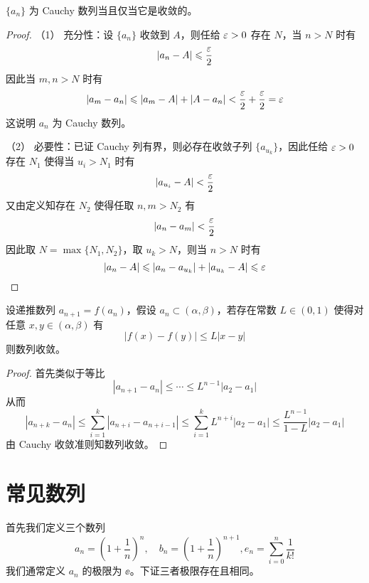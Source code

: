 \begin{theorem}
	$\{a_n\}$ 为 Cauchy 数列当且仅当它是收敛的。
\end{theorem}
\begin{proof}
	（1） 充分性：设 $\{a_n\}$ 收敛到 $A$，则任给 $\varepsilon >0$ 存在 $N$，当 $n>N$ 时有
	\[|a_n-A|\leqslant \frac{\varepsilon}{2}\]
	因此当 $m,n>N$ 时有
	\[|a_m-a_n| \leqslant |a_m-A| + |A-a_n| < \frac{\varepsilon}{2}+\frac{\varepsilon}{2}=\varepsilon\]
	这说明 $a_n$ 为 Cauchy 数列。

	（2） 必要性：已证 Cauchy 列有界，则必存在收敛子列 $\{a_{u_k}\}$，因此任给 $\varepsilon > 0$ 存在 $N_1$ 使得当 $u_i > N_1$ 时有
	\[ | a_{u_i} - A| < \frac{\varepsilon}{2} \]
	又由定义知存在 $N_2$ 使得任取 $n, m > N_2$ 有
	\[ |a_n - a_m| < \frac{\varepsilon}{2} \]
	因此取 $N = \max\{N_1, N_2\}$，取 $u_k > N$，则当 $n > N$ 时有
	\[ |a_n - A| \leqslant |a_n - a_{u_k}| + | a_{u_k} - A| \leqslant \varepsilon \]
\end{proof}

\begin{theorem}[不动点原理]
	设递推数列 $a_{n+1} = f(a_n)$，假设 $a_n \subset (\alpha, \beta)$，若存在常数 $L \in (0, 1)$ 使得对任意 $x,y \in (\alpha, \beta)$ 有
	\[ |f(x) - f(y)| \leqslant L|x-y| \]
	则数列收敛。
\end{theorem}

\begin{proof}
	首先类似于等比
	\[ |a_{n+1} - a_n| \leqslant \cdots \leqslant L^{n-1}|a_2 - a_1| \]
	从而
	\[ |a_{n+k} - a_{n}| \leqslant \sum_{i=1}^{k} |a_{n + i} - a_{n + i - 1}| \leqslant \sum_{i=1}^{k} L^{n+i} |a_{2} - a_{1}| \leqslant \frac{L^{n-1}}{1-L}|a_2 - a_1|  \]
	由 Cauchy 收敛准则知数列收敛。
\end{proof}

\section{常见数列}

首先我们定义三个数列
\[ a_n = \left(1 + \frac{1}{n}\right)^n, \quad b_n = \left(1 + \frac{1}{n}\right)^{n+1}, e_n = \sum_{i=0}^{n}\frac{1}{k!} \]
我们通常定义 $a_n$ 的极限为 $\ee$。下证三者极限存在且相同。


